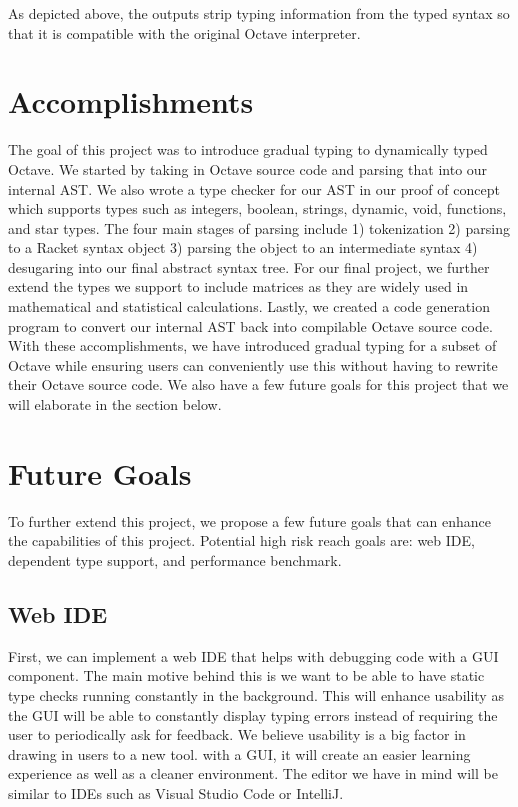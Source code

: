 As depicted above, the outputs strip typing information from the typed syntax so that it is compatible with the original Octave interpreter.

\section{Accomplishments}
The goal of this project was to introduce gradual typing to dynamically typed Octave. We started by taking in Octave source code and parsing that into our internal AST. We also wrote a type checker for our AST in our proof of concept which supports types such as integers, boolean, strings, dynamic, void, functions, and star types. The four main stages of parsing include 1) tokenization 2) parsing to a Racket syntax object 3) parsing the object to an intermediate syntax 4) desugaring into our final abstract syntax tree. For our final project, we further extend the types we support to include matrices as they are widely used in mathematical and statistical calculations. Lastly, we created a code generation program to convert our internal AST back into compilable Octave source code. With these accomplishments, we have introduced gradual typing for a subset of Octave while ensuring users can conveniently use this without having to rewrite their Octave source code. We also have a few future goals for this project that we will elaborate in the section below.

\section{Future Goals}
To further extend this project, we propose a few future goals that can enhance the capabilities of this project. Potential high risk reach goals are: web IDE, dependent type support, and performance benchmark.

\subsection{Web IDE}
First, we can implement a web IDE that helps with debugging code with a GUI component. The main motive behind this is we want to be able to have static type checks running constantly in the background. This will enhance usability as the GUI will be able to constantly display typing errors instead of requiring the user to periodically ask for feedback. We believe usability is a big factor in drawing in users to a new tool. with a GUI, it will create an easier learning experience as well as a cleaner environment. The editor we have in mind will be similar to IDEs such as Visual Studio Code or IntelliJ.

